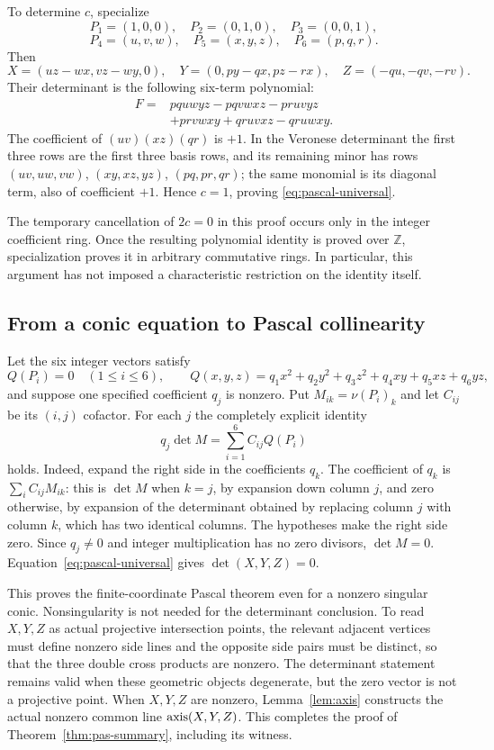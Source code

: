 To determine $c$, specialize
\[
 P_1=(1,0,0),\quad P_2=(0,1,0),\quad P_3=(0,0,1),
\]
\[
 P_4=(u,v,w),\quad P_5=(x,y,z),\quad P_6=(p,q,r).
\]
Then
\[
 X=(uz-wx,vz-wy,0),\quad
 Y=(0,py-qx,pz-rx),\quad
 Z=(-qu,-qv,-rv).
\]
Their determinant is the following six-term polynomial:
\begin{align*}
 F={}&pquwyz-pqvwxz-pruvyz\\
     &+prvwxy+qruvxz-qruwxy.
\end{align*}
The coefficient of $(uv)(xz)(qr)$ is $+1$.
In the Veronese determinant the first three rows are the first three basis
rows, and its remaining minor has rows
$(uv,uw,vw)$, $(xy,xz,yz)$, $(pq,pr,qr)$; the same monomial is its diagonal
term, also of coefficient $+1$.  Hence $c=1$, proving
\eqref{eq:pascal-universal}.

The temporary cancellation of $2c=0$ in this proof occurs only in the
integer coefficient ring.  Once the resulting polynomial identity is
proved over $\mathbb Z$, specialization proves it in arbitrary commutative
rings.  In particular, this argument has not imposed a characteristic
restriction on the identity itself.

\subsection{From a conic equation to Pascal collinearity}
Let the six integer vectors satisfy
\[
 Q(P_i)=0\quad(1\leq i\leq6),\qquad
 Q(x,y,z)=q_1x^2+q_2y^2+q_3z^2+q_4xy+q_5xz+q_6yz,
\]
and suppose one specified coefficient $q_j$ is nonzero.  Put
$M_{ik}=\nu(P_i)_k$ and let $C_{ij}$ be its $(i,j)$ cofactor.
For each $j$ the completely explicit identity
\begin{equation}\label{eq:conic-certificate}
 q_j\det M=\sum_{i=1}^6 C_{ij}Q(P_i)
\end{equation}
holds.  Indeed, expand the right side in the coefficients $q_k$.
The coefficient of $q_k$ is $\sum_i C_{ij}M_{ik}$: this is $\det M$ when
$k=j$, by expansion down column $j$, and zero otherwise, by expansion of
the determinant obtained by replacing column $j$ with column $k$, which
has two identical columns.  The hypotheses make the right side zero.
Since $q_j\ne0$ and integer multiplication has no zero divisors,
$\det M=0$.  Equation~\eqref{eq:pascal-universal} gives
$\det(X,Y,Z)=0$.

This proves the finite-coordinate Pascal theorem even for a nonzero
singular conic.  Nonsingularity is not needed for the determinant
conclusion.  To read $X,Y,Z$ as actual projective intersection points,
the relevant adjacent vertices must define nonzero side lines and the
opposite side pairs must be distinct, so that the three double cross
products are nonzero.  The determinant statement remains valid when
these geometric objects degenerate, but the zero vector is not a
projective point. When $X,Y,Z$ are nonzero, Lemma~\ref{lem:axis}
constructs the actual nonzero common line $\operatorname{axis}(X,Y,Z)$. This completes
the proof of Theorem~\ref{thm:pas-summary}, including its witness.


